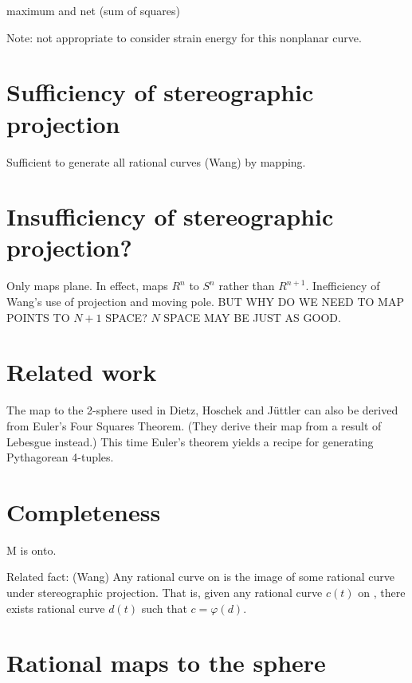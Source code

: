 maximum and net (sum of squares)



Note: not appropriate to consider strain energy for this nonplanar curve.


\section{Sufficiency of stereographic projection}

Sufficient to generate all rational curves (Wang) by mapping.

\section{Insufficiency of stereographic projection?}

Only maps plane.
In effect, maps $R^n$ to $S^n$ rather than $R^{n+1}$.
Inefficiency of Wang's use of projection and moving pole.
BUT WHY DO WE NEED TO MAP POINTS TO $N+1$ SPACE?
$N$ SPACE MAY BE JUST AS GOOD.

\section{Related work}

The map to the 2-sphere used in Dietz, Hoschek and J\"{u}ttler
\cite{} can also be derived from Euler's Four Squares Theorem.
(They derive their map from a result of Lebesgue instead.)
This time Euler's theorem yields a recipe for generating Pythagorean 4-tuples.


\section{Completeness}

M is onto.

Related fact: (Wang) Any rational curve on  is the image of some
	rational curve under stereographic projection.
	That is, given any rational curve $c(t)$ on ,
	there exists rational curve $d(t)$ such that $c = \varphi (d)$.

\section{Rational maps to the sphere}


